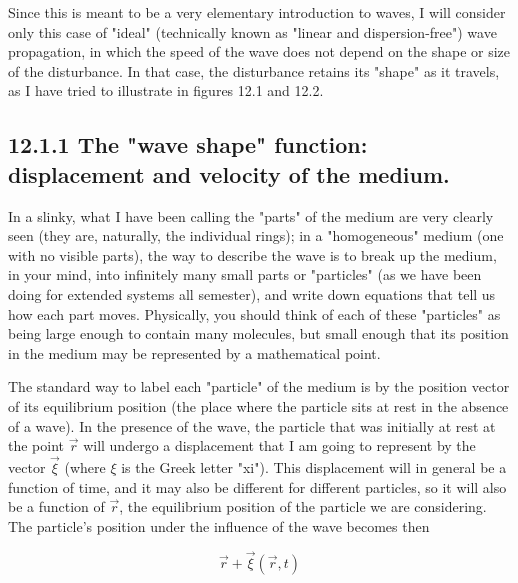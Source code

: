 \documentclass[10pt]{article}
\begin{document}
Since this is meant to be a very elementary introduction to waves, I will consider only this case of "ideal" (technically known as "linear and dispersion-free") wave propagation, in which the speed of the wave does not depend on the shape or size of the disturbance. In that case, the disturbance retains its "shape" as it travels, as I have tried to illustrate in figures 12.1 and 12.2.

\subsection*{12.1.1 The "wave shape" function: displacement and velocity of the medium.}
In a slinky, what I have been calling the "parts" of the medium are very clearly seen (they are, naturally, the individual rings); in a "homogeneous" medium (one with no visible parts), the way to describe the wave is to break up the medium, in your mind, into infinitely many small parts or "particles" (as we have been doing for extended systems all semester), and write down equations that tell us how each part moves. Physically, you should think of each of these "particles" as being large enough to contain many molecules, but small enough that its position in the medium may be represented by a mathematical point.

The standard way to label each "particle" of the medium is by the position vector of its equilibrium position (the place where the particle sits at rest in the absence of a wave). In the presence of the wave, the particle that was initially at rest at the point $\vec{r}$ will undergo a displacement that I am going to represent by the vector $\vec{\xi}$ (where $\xi$ is the Greek letter "xi"). This displacement will in general be a function of time, and it may also be different for different particles, so it will also be a function of $\vec{r}$, the equilibrium position of the particle we are considering. The particle's position under the influence of the wave becomes then


\begin{equation*}
\vec{r}+\vec{\xi}(\vec{r}, t) \tag{12.1}
\end{equation*}
\end{document}
